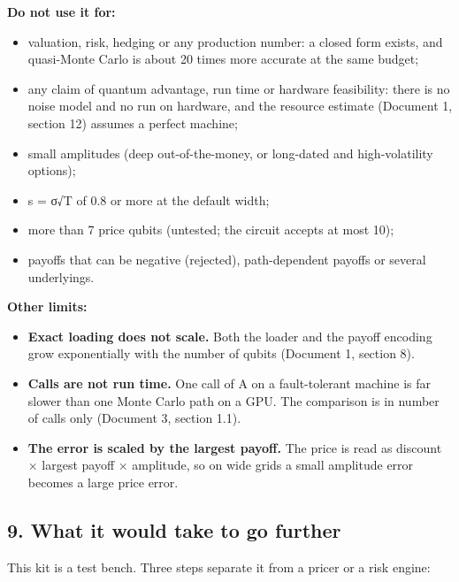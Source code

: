 \documentclass[
  10pt,
]{article}
\providecommand{\tightlist}{%
  \setlength{\itemsep}{0pt}\setlength{\parskip}{0pt}}
\begin{document}
\textbf{Do not use it for:}

\begin{itemize}
\tightlist
\item
  valuation, risk, hedging or any production number: a closed form
  exists, and quasi-Monte Carlo is about 20 times more accurate at the
  same budget;
\item
  any claim of quantum advantage, run time or hardware feasibility:
  there is no noise model and no run on hardware, and the resource
  estimate (Document 1, section 12) assumes a perfect machine;
\item
  small amplitudes (deep out-of-the-money, or long-dated and
  high-volatility options);
\item
  s = σ√T of 0.8 or more at the default width;
\item
  more than 7 price qubits (untested; the circuit accepts at most 10);
\item
  payoffs that can be negative (rejected), path-dependent payoffs or
  several underlyings.
\end{itemize}

\textbf{Other limits:}

\begin{itemize}
\tightlist
\item
  \textbf{Exact loading does not scale.} Both the loader and the payoff
  encoding grow exponentially with the number of qubits (Document 1,
  section 8).
\item
  \textbf{Calls are not run time.} One call of A on a fault-tolerant
  machine is far slower than one Monte Carlo path on a GPU. The
  comparison is in number of calls only (Document 3, section 1.1).
\item
  \textbf{The error is scaled by the largest payoff.} The price is read
  as discount × largest payoff × amplitude, so on wide grids a small
  amplitude error becomes a large price error.
\end{itemize}

\hypertarget{9-what-it-would-take-to-go-further}{%
\subsection{9. What it would take to go
further}\label{9-what-it-would-take-to-go-further}}

This kit is a test bench. Three steps separate it from a pricer or a
risk engine:
\end{document}
